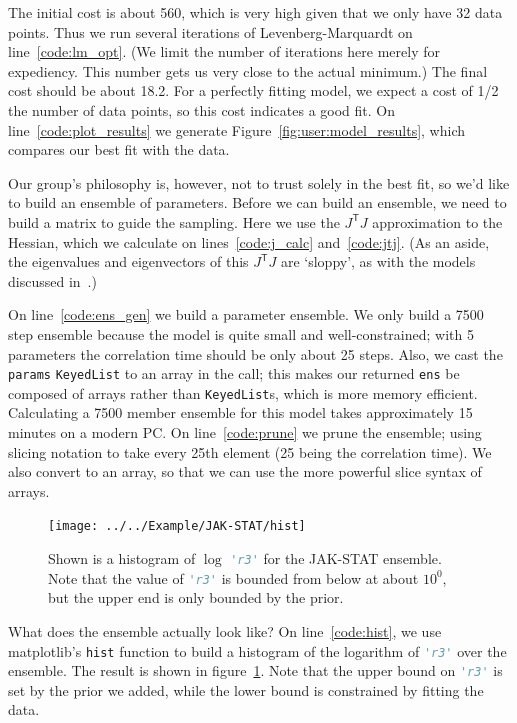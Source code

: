\documentclass[12pt]{article}
\makeatletter
\newcommand{\transpose}[1]{\ensuremath{{#1}^\mathsf{T}}}
\newcommand{\JtJ}{\ensuremath{\transpose{J}\!J}\xspace}
\newcommand{\py}[1]{\lstinline[language=Python, showstringspaces=False]@#1@}
\makeatother
\begin{document}
The initial cost is about 560, which is very high given that we only have 32 data points.
Thus we run several iterations of Levenberg-Marquardt on line~\ref{code:lm_opt}.
(We limit the number of iterations here merely for expediency. This number gets us very close to the actual minimum.)
The final cost should be about 18.2. For a perfectly fitting model, we expect a cost of 1/2 the number of data points, so this cost indicates a good fit.
On line~\ref{code:plot_results} we generate Figure~\ref{fig:user:model_results}, which compares our best fit with the data.

Our group's philosophy is, however, not to trust solely in the best fit, so we'd like to build an ensemble of parameters.
Before we can build an ensemble, we need to build a matrix to guide the sampling.
Here we use the \JtJ approximation to the Hessian, which we calculate on lines~\ref{code:j_calc} and~\ref{code:jtj}.
(As an aside, the eigenvalues and eigenvectors of this \JtJ are `sloppy', as with the models discussed in~\cite{bib:Brown2003a, bib:Waterfall2006, bib:Gutenkunst2007}.)

On line~\ref{code:ens_gen} we build a parameter ensemble.
We only build a 7500 step ensemble because the model is quite small and well-constrained; with 5 parameters the correlation time should be only about 25 steps.
Also, we cast the \py{params} \py{KeyedList} to an array in the call; this makes our returned \py{ens} be composed of arrays rather than \py{KeyedList}s, which is more memory efficient.
Calculating a 7500 member ensemble for this model takes approximately 15 minutes on a modern PC.
On line~\ref{code:prune} we prune the ensemble; using slicing notation to take every 25th element (25 being the correlation time).
We also convert to an array, so that we can use the more powerful slice syntax of arrays.

\begin{figure}
\begin{center}
\texttt{[image: ../../Example/JAK-STAT/hist]}
\end{center}
\caption[Histogram of $\log$ \py{'r3'} for the JAK-STAT model]{Shown is a histogram of $\log$ \py{'r3'} for the JAK-STAT ensemble. Note that the value of \py{'r3'} is bounded from below at about $10^0$, but the upper end is only bounded by the prior.\label{fig:user:hist}}
\end{figure}

What does the ensemble actually look like?
On line~\ref{code:hist}, we use matplotlib's \py{hist} function to build a histogram of the logarithm of \py{'r3'} over the ensemble.
The result is shown in figure~\ref{fig:user:hist}.
Note that the upper bound on \py{'r3'} is set by the prior we added, while the lower bound is constrained by fitting the data.
\end{document}
